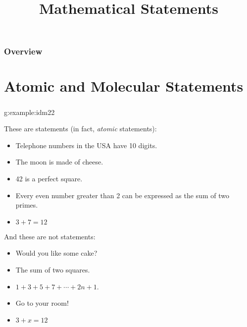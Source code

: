 \documentclass[11pt, compress]{beamer}
\title{Mathematical Statements}
\subtitle{}
\begin{document}
\begin{frame}
\maketitle 
\end{frame}
 
\begin{frame}
\frametitle{Overview}
\tableofcontents 
\end{frame}
 

\section{Atomic and Molecular Statements}
\begin{frame}
\frametitle{}
\begin{example}{}{g:example:idm22}%

These are statements (in fact, \emph{atomic} statements):\begin{itemize}
\item{}
Telephone numbers in the USA have 10 digits.

\item{}
The moon is made of cheese.

\item{}
42 is a perfect square.

\item{}
Every even number greater than 2 can be expressed as the sum of two primes.

\item{}
\(3+7 = 12\)
\end{itemize}And these are not statements:\begin{itemize}
\item{}
Would you like some cake?

\item{}
The sum of two squares.

\item{}\(1+3+5+7+\cdots+2n+1\).

\item{}
Go to your room!

\item{}
\(3+x = 12\)
\end{itemize}\end{example}
\end{frame}
 
\end{document}

